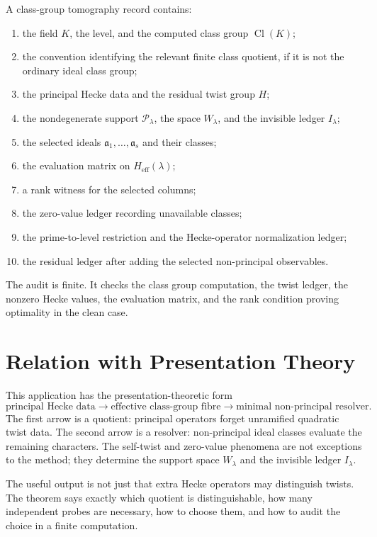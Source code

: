 \documentclass[11pt]{article}
\DeclareMathOperator{\Cl}{Cl}
\begin{document}
A class-group tomography record contains:
\begin{enumerate}[label=\textup{(\roman*)}]
\item the field \(K\), the level, and the computed class group \(\Cl(K)\);
\item the convention identifying the relevant finite class quotient, if it is not the ordinary ideal class group;
\item the principal Hecke data and the residual twist group \(H\);
\item the nondegenerate support \(\mathcal P_\lambda\), the space \(W_\lambda\), and the invisible ledger \(I_\lambda\);
\item the selected ideals \(\mathfrak a_1,\ldots,\mathfrak a_s\) and their classes;
\item the evaluation matrix on \(H_{\mathrm{eff}}(\lambda)\);
\item a rank witness for the selected columns;
\item the zero-value ledger recording unavailable classes;
\item the prime-to-level restriction and the Hecke-operator normalization ledger;
\item the residual ledger after adding the selected non-principal observables.
\end{enumerate}

The audit is finite.  It checks the class group computation, the twist ledger, the nonzero Hecke values, the evaluation matrix, and the rank condition proving optimality in the clean case.

\section{Relation with Presentation Theory}

This application has the presentation-theoretic form
\[
\text{principal Hecke data}
\longrightarrow
\text{effective class-group fibre}
\longrightarrow
\text{minimal non-principal resolver}.
\]
The first arrow is a quotient: principal operators forget unramified quadratic twist data.  The second arrow is a resolver: non-principal ideal classes evaluate the remaining characters.  The self-twist and zero-value phenomena are not exceptions to the method; they determine the support space \(W_\lambda\) and the invisible ledger \(I_\lambda\).

The useful output is not just that extra Hecke operators may distinguish twists.  The theorem says exactly which quotient is distinguishable, how many independent probes are necessary, how to choose them, and how to audit the choice in a finite computation.
\end{document}
